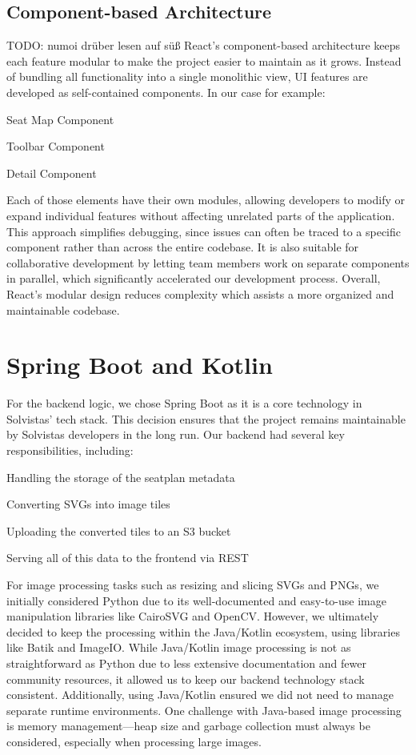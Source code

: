 \subsection{Component-based Architecture}
TODO: numoi drüber lesen auf süß
React’s component-based architecture keeps each feature modular to make the project easier to maintain as it grows. Instead of bundling all functionality into a single monolithic view, UI features are developed as self-contained components. In our case for example:
\begin{compactitem}
    \item Seat Map Component
    \item Toolbar Component
    \item Detail Component
\end{compactitem}
Each of those elements have their own modules, allowing developers to modify or expand individual features without affecting unrelated parts of the application. This approach simplifies debugging, since issues can often be traced to a specific component rather than across the entire codebase. It is also suitable for collaborative development by letting team members work on separate components in parallel, which significantly accelerated our development process. Overall, React’s modular design reduces complexity which assists a more organized and maintainable codebase.
~\cite{ReactCBA01, ReactCBA02, ReactCBA03}

\section{Spring Boot and Kotlin}
For the backend logic, we chose Spring Boot as it is a core technology in Solvistas’ tech stack. This decision ensures that the project remains maintainable by Solvistas developers in the long run. Our backend had several key responsibilities, including:
\begin{compactitem}
    \item Handling the storage of the seatplan metadata
    \item Converting SVGs into image tiles
    \item Uploading the converted tiles to an S3 bucket
    \item Serving all of this data to the frontend via REST
\end{compactitem}

For image processing tasks such as resizing and slicing SVGs and PNGs, we initially considered Python due to its well-documented and easy-to-use image manipulation libraries like CairoSVG and OpenCV. However, we ultimately decided to keep the processing within the Java/Kotlin ecosystem, using libraries like Batik and ImageIO. While Java/Kotlin image processing is not as straightforward as Python due to less extensive documentation and fewer community resources, it allowed us to keep our backend technology stack consistent. Additionally, using Java/Kotlin ensured we did not need to manage separate runtime environments. One challenge with Java-based image processing is memory management—heap size and garbage collection must always be considered, especially when processing large images.


